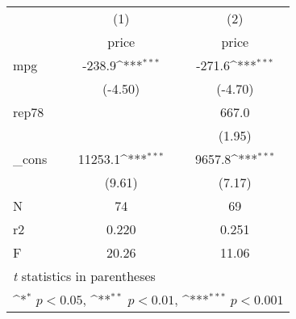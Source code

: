 {
\def\sym#1{\ifmmode^{#1}\else\(^{#1}\)\fi}
\begin{tabular}{l*{2}{c}}
\hline\hline
            &\multicolumn{1}{c}{(1)}&\multicolumn{1}{c}{(2)}\\
            &\multicolumn{1}{c}{price}&\multicolumn{1}{c}{price}\\
\hline
mpg         &      -238.9\sym{***}&      -271.6\sym{***}\\
            &     (-4.50)         &     (-4.70)         \\
[1em]
rep78       &                     &       667.0         \\
            &                     &      (1.95)         \\
[1em]
\_cons      &     11253.1\sym{***}&      9657.8\sym{***}\\
            &      (9.61)         &      (7.17)         \\
\hline
N           &          74         &          69         \\
r2          &       0.220         &       0.251         \\
F           &       20.26         &       11.06         \\
\hline\hline
\multicolumn{3}{l}{\footnotesize \textit{t} statistics in parentheses}\\
\multicolumn{3}{l}{\footnotesize \sym{*} \(p<0.05\), \sym{**} \(p<0.01\), \sym{***} \(p<0.001\)}\\
\end{tabular}
}
